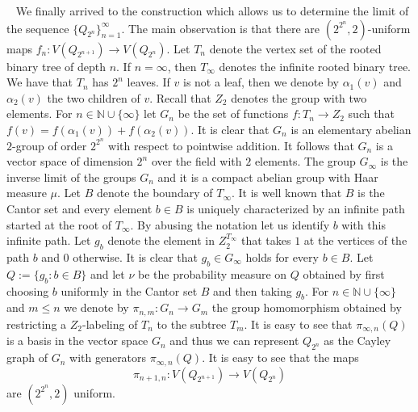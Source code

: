 \documentclass[a4wider]{amsart}
\theoremstyle{definitionbreak}\newtheorem{D}[theorem]{Definition}
\theoremstyle{definitionbreak}\newtheorem*{D*}{Definition}
\begin{document}
~ We finally arrived to the construction which allows us to determine the limit of the sequence $\{Q_{2^n}\}_{n=1}^\infty$. The main observation is that there are $(2^{2^n},2)$-uniform maps $f_n:V(Q_{2^{n+1}})\to V(Q_{2^n})$. Let $T_n$ denote the vertex set of the rooted binary tree of depth $n$. If $n=\infty$, then $T_\infty$ denotes the infinite rooted binary tree. We have that $T_n$ has $2^n$ leaves. If $v$ is not a leaf, then we denote by $\alpha_1(v)$ and $\alpha_2(v)$ the two children of $v$. Recall that $Z_2$ denotes the group with two elements. For $n\in\mathbb{N}\cup\{\infty\}$ let $G_n$ be the set of functions $f:T_n\to Z_2$ such that $f(v)=f(\alpha_1(v))+f(\alpha_2(v))$. It is clear that $G_n$ is an elementary abelian $2$-group of order $2^{2^n}$ with respect to pointwise addition. It follows that $G_n$ is a vector space of dimension $2^n$ over the field with $2$ elements. The group $G_\infty$ is the inverse limit of the groups $G_n$ and it is a compact abelian group with Haar measure $\mu$. 
Let $B$ denote the boundary of $T_\infty$. It is well known that $B$ is the Cantor set and every element $b\in B$ is uniquely characterized by an infinite path started at the root of $T_\infty$. By abusing the notation let us identify $b$ with this infinite path. Let $g_b$ denote the element in $Z_2^{T_\infty}$ that takes $1$ at the vertices of the path $b$ and $0$ otherwise. It is clear that $g_b\in G_\infty$ holds for every $b\in B$.  Let $Q:=\{g_b:b\in B\}$ and let $\nu$ be the probability measure on $Q$ obtained by first choosing $b$ uniformly in the Cantor set $B$ and then taking $g_b$. For $n\in\mathbb{N}\cup\{\infty\}$ and $m\leq n$ we denote by $\pi_{n,m}:G_n\to G_m$ the group homomorphism obtained by restricting a $Z_2$-labeling of $T_n$ to the subtree $T_m$. It is easy to see that $\pi_{\infty,n}(Q)$ is a basis in the vector space $G_n$ and thus we can represent $Q_{2^n}$ as the Cayley graph of $G_n$ with generators $\pi_{\infty,n}(Q)$. It is easy to see that the maps $$\pi_{n+1,n}:V(Q_{2^{n+1}})\to V(Q_{2^n})$$ are $(2^{2^n},2)$ uniform.

 
\end{document}
